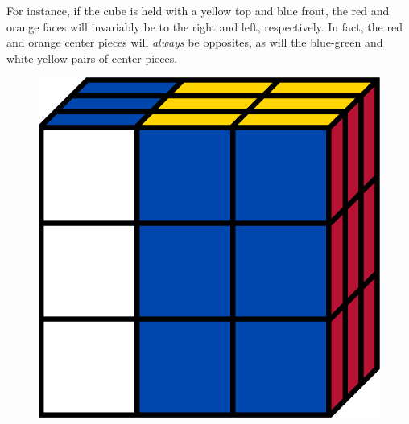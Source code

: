 \documentclass[12pt]{article}
\begin{document}
For instance, if the cube is held with a yellow top and blue front, the red and orange faces will invariably be to the right and left, respectively. In fact, the red and orange center pieces will \textit{always} be opposites, as will the blue-green and white-yellow pairs of center pieces.\\

\begin{figure}[h]
    \centering
    \begin{minipage}[c]{0.2\textwidth}
        \includegraphics[scale=0.1]{cubeLp.png}
    \end{minipage}
    \begin{minipage}[c]{0.05\textwidth}
        \centering
    \end{minipage}
    \hspace{0.5cm}
    \begin{minipage}[c]{0.2\textwidth}

\end{minipage}
\end{figure}
\end{document}
